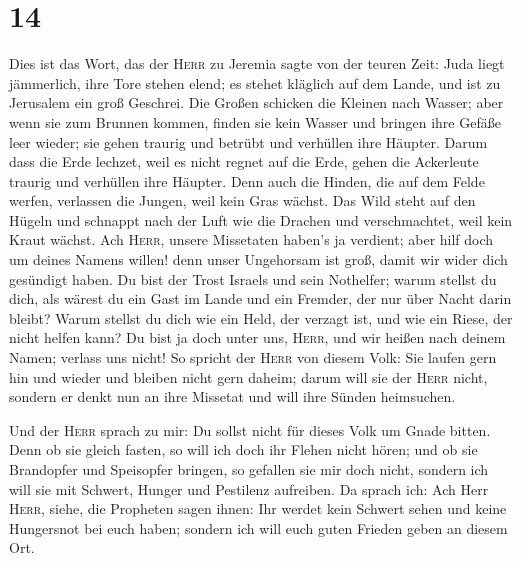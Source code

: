 \hypertarget{section-13}{%
\section{14}\label{section-13}}

 Dies ist das Wort, das der \textsc{Herr} zu Jeremia sagte
von der teuren Zeit:  Juda liegt jämmerlich, ihre Tore
stehen elend; es stehet kläglich auf dem Lande, und ist zu Jerusalem ein
groß Geschrei.  Die Großen schicken die Kleinen nach
Wasser; aber wenn sie zum Brunnen kommen, finden sie kein Wasser und
bringen ihre Gefäße leer wieder; sie gehen traurig und betrübt und
verhüllen ihre Häupter.  Darum dass die Erde lechzet, weil
es nicht regnet auf die Erde, gehen die Ackerleute traurig und verhüllen
ihre Häupter.  Denn auch die Hinden, die auf dem Felde
werfen, verlassen die Jungen, weil kein Gras wächst.  Das
Wild steht auf den Hügeln und schnappt nach der Luft wie die Drachen und
verschmachtet, weil kein Kraut wächst.  Ach \textsc{Herr},
unsere Missetaten haben's ja verdient; aber hilf doch um deines Namens
willen! denn unser Ungehorsam ist groß, damit wir wider dich gesündigt
haben.  Du bist der Trost Israels und sein Nothelfer;
warum stellst du dich, als wärest du ein Gast im Lande und ein Fremder,
der nur über Nacht darin bleibt?  Warum stellst du dich
wie ein Held, der verzagt ist, und wie ein Riese, der nicht helfen kann?
Du bist ja doch unter uns, \textsc{Herr}, und wir heißen nach deinem
Namen; verlass uns nicht!  So spricht der \textsc{Herr}
von diesem Volk: Sie laufen gern hin und wieder und bleiben nicht gern
daheim; darum will sie der \textsc{Herr} nicht, sondern er denkt nun an
ihre Missetat und will ihre Sünden heimsuchen.

 Und der \textsc{Herr} sprach zu mir: Du sollst nicht für
dieses Volk um Gnade bitten.  Denn ob sie gleich fasten,
so will ich doch ihr Flehen nicht hören; und ob sie Brandopfer und
Speisopfer bringen, so gefallen sie mir doch nicht, sondern ich will sie
mit Schwert, Hunger und Pestilenz aufreiben.  Da sprach
ich: Ach Herr \textsc{Herr}, siehe, die Propheten sagen ihnen: Ihr
werdet kein Schwert sehen und keine Hungersnot bei euch haben; sondern
ich will euch guten Frieden geben an diesem Ort.

